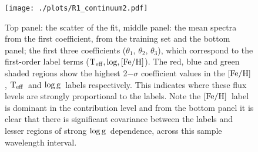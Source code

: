 \documentclass[12pt, preprint]{aastex}
\newcommand{\teff}{\mbox{$\rm T_{eff}$}}
\newcommand{\feh}{\mbox{$\rm [Fe/H]$}}
\newcommand{\logg}{\mbox{$\rm \log g$}}
\begin{document}
 
\begin{figure}[h!]
\centering
    \texttt{[image: ./plots/R1\_continuum2.pdf]}
  \caption{Top panel: the scatter of the fit, middle panel: the mean spectra from the first coefficient, from the training set and the bottom panel; the first three coefficients ($\theta_1$, $\theta_2$, $\theta_3$),  which correspond to the first-order label terms ($\teff, \log, \feh$).   The red, blue and green shaded regions show the highest 2$-\sigma$ coefficient values in the \feh, \teff\ and \logg\ labels respectively. This indicates where these flux levels are strongly proportional to the labels. Note the \feh\ label is dominant in the contribution level and from the bottom panel it is clear that there is significant covariance between the labels and lesser regions of strong \logg\ dependence, across this sample wavelength interval.}
\label{fig:coeffs}
\end{figure}


%
\end{document}
